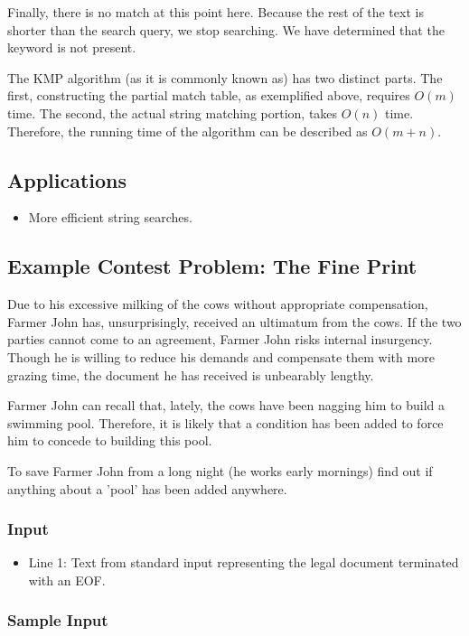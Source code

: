 Finally, there is no match at this point here.
Because the rest of the text is shorter than the search query, we stop searching.
We have determined that the keyword is not present.

The KMP algorithm (as it is commonly known as) has two distinct parts.
The first, constructing the partial match table, as exemplified above, requires $O(m)$ time.
The second, the actual string matching portion, takes $O(n)$ time.
Therefore, the running time of the algorithm can be described as $O(m + n)$.

\subsection{Applications}
\begin{itemize}
	\item More efficient string searches.
\end{itemize}

\subsection{Example Contest Problem: The Fine Print}
Due to his excessive milking of the cows without appropriate compensation, Farmer John has, unsurprisingly, received an ultimatum from the cows.
If the two parties cannot come to an agreement, Farmer John risks internal insurgency.
Though he is willing to reduce his demands and compensate them with more grazing time, the document he has received is unbearably lengthy.

Farmer John can recall that, lately, the cows have been nagging him to build a swimming pool.
Therefore, it is likely that a condition has been added to force him to concede to building this pool.

To save Farmer John from a long night (he works early mornings) find out if anything about a 'pool' has been added anywhere.

\subsubsection{Input}
\begin{itemize}
	\item Line 1: Text from standard input representing the legal document terminated with an EOF.
\end{itemize}

\subsubsection{Sample Input}

